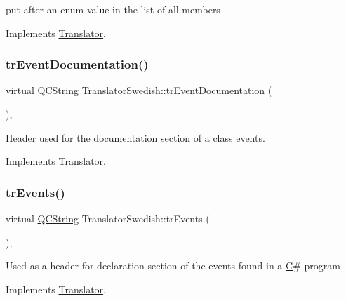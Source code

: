 put after an enum value in the list of all members 

Implements \mbox{\hyperlink{class_translator}{Translator}}.

\mbox{\label{class_translator_swedish_a0a33dc654bb806ff20eb6c822672b8ce}} 
\subsubsection{\texorpdfstring{trEventDocumentation()}{trEventDocumentation()}}
{\footnotesize\ttfamily virtual \mbox{\hyperlink{class_q_c_string}{Q\+C\+String}} Translator\+Swedish\+::tr\+Event\+Documentation (\begin{DoxyParamCaption}{ }\end{DoxyParamCaption})\hspace{0.3cm}{\ttfamily [inline]}, {\ttfamily [virtual]}}

Header used for the documentation section of a class\textquotesingle{} events. 

Implements \mbox{\hyperlink{class_translator}{Translator}}.

\mbox{\label{class_translator_swedish_aa9a8c0ed7b9af1c2cd22a39a49f4a013}} 
\subsubsection{\texorpdfstring{trEvents()}{trEvents()}}
{\footnotesize\ttfamily virtual \mbox{\hyperlink{class_q_c_string}{Q\+C\+String}} Translator\+Swedish\+::tr\+Events (\begin{DoxyParamCaption}{ }\end{DoxyParamCaption})\hspace{0.3cm}{\ttfamily [inline]}, {\ttfamily [virtual]}}

Used as a header for declaration section of the events found in a \mbox{\hyperlink{class_c}{C}}\# program 

Implements \mbox{\hyperlink{class_translator}{Translator}}.

\mbox{\label{class_translator_swedish_abee7920ce9cf90ab369e8be7ba0a594b}} 
